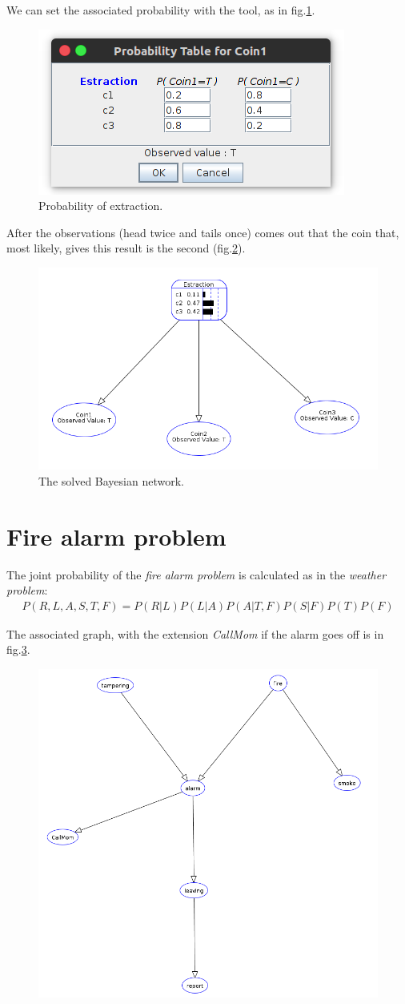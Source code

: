 \documentclass[10pt,a4paper]{article}
\begin{document}
We can set the associated probability with the tool, as in fig.\ref{fig:Coin_prob}.

\begin{figure}
\centering
\includegraphics[width=0.7\linewidth]{../Coin_prob}
\caption{Probability of extraction.}
\label{fig:Coin_prob}
\end{figure}

After the observations (head twice and tails once) comes out that the coin that, most likely, gives this result is the second (fig.\ref{fig:Coin_solved}).

\begin{figure}
\centering
\includegraphics[width=0.7\linewidth]{../Coin_solved}
\caption{The solved Bayesian network.}
\label{fig:Coin_solved}
\end{figure}

\section{Fire alarm problem}

The joint probability of the \emph{fire alarm problem} is calculated as in the \emph{weather problem}:
\begin{align*}
P(R,L,A,S,T,F) = P(R|L)P(L|A)P(A|T,F)P(S|F)P(T)P(F)
\end{align*}

The associated graph, with the extension \emph{CallMom} if the alarm goes off is in fig.\ref{fig:Fire_alarm}.
\begin{figure}
\centering
\includegraphics[width=0.7\linewidth]{../Fire_alarm}
\caption{}
\label{fig:Fire_alarm}
\end{figure}
\end{document}
